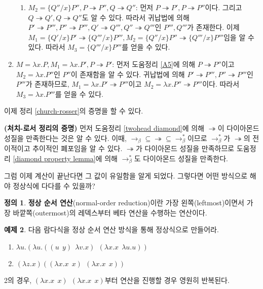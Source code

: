 \documentclass[b5paper, 11pt]{book}
\theoremstyle{definition}
\newtheorem{defn}{정의}[chapter]
\newtheorem{ex}[defn]{예제}
\newenvironment{pf*}{\pushQED{\qed}\pf}
{\popQED\endpf}
\begin{document}
\begin{pf*}
\begin{enumerate}
\begin{enumerate}
            \item $M_2 = \{Q'' / x\} P'', P\twoheadrightarrow P'', Q \twoheadrightarrow Q''$: 먼저 $P\twoheadrightarrow P', P \twoheadrightarrow P''$이다. 그리고 $Q \twoheadrightarrow Q', Q \twoheadrightarrow Q''$도 알 수 있다. 따라서 귀납법에 의해 $P' \twoheadrightarrow P''', P'' \twoheadrightarrow P''', Q' \twoheadrightarrow Q''', Q'' \twoheadrightarrow Q'''$인 $P''', Q'''$가 존재한다. 이제 $M_1 = \{Q' / x\} P' \twoheadrightarrow \{Q''' / x\} P''', M_2  = \{Q'' / x\} P'' \twoheadrightarrow \{Q''' / x\} P'''$임을 알 수 있다. 따라서 $M_3 = \{Q''' / x\} P'''$를 얻을 수 있다.
        \end{enumerate}
        \item $M = \lambda x. P, M_1 = \lambda x .P', P \twoheadrightarrow P'$: 먼저 도움정리 \ref{A5}에 의해 $ P \twoheadrightarrow P'' $이고 $M_2 = \lambda x . P''$인 $P''$이 존재함을 알 수 있다. 귀납법에 의해 $P' \twoheadrightarrow P''', P'' \twoheadrightarrow P'''$인 $P'''$가 존재하므로, $M_1 = \lambda x. P' \twoheadrightarrow P'''$이고 $M_2 = \lambda x. P'' \twoheadrightarrow P'''$이다. 따라서 $M_3 = \lambda x . P'''$를 얻을 수 있다. 
    \end{enumerate}
\end{pf*}
이제 정리 \ref{church-rosser}의 증명을 할 수 있다. 
\begin{pf*} 
    \textbf{(처치-로서 정리의 증명)} 먼저 도움정리 \ref{twohead diamond}에 의해 $\twoheadrightarrow$이 다이아몬드 성질을 만족한다는 것은 알 수 있다. 이때, $\rightarrow_\beta \subseteq \twoheadrightarrow \subseteq \rightarrow_\beta^*$이므로 $\rightarrow_\beta^*$가 $\twoheadrightarrow$의 전이적이고 추이적인 폐포임을 알 수 있다. $\twoheadrightarrow$가 다이아몬드 성질을 만족하므로 도움정리 \ref{diamond property lemma}에 의해 $\rightarrow_\beta^*$도 다이아몬드 성질을 만족한다.
\end{pf*}
그럼 이제 계산이 끝난다면 그 값이 유일함을 알게 되었다. 그렇다면 어떤 방식으로 해야 정상식에 다다를 수 있을까?
\begin{defn}
    \textbf{정상 순서 연산}(normal-order reduction)이란 가장 왼쪽(leftmost)이면서 가장 바깥쪽(outermost)의 레덱스부터 베타 연산을 수행하는 연산이다.
\end{defn}
\begin{ex}
    다음 람다식을 정상 순서 연산 방식을 통해 정상식으로 만들어라.
    \begin{enumerate}
        \item $\lambda u. (\lambda u. ((u \;\, y) \;\, \lambda v. x) \;\, (\lambda x. x \;\, \lambda u. u))$
        \item $(\lambda z. x) ((\lambda x . x \;\, x) \;\, (\lambda x. x \;\, x))$
    \end{enumerate}
    2의 경우, $(\lambda x . x \;\, x) \;\, (\lambda x. x \;\, x)$부터 연산을 진행할 경우 영원히 반복된다.
\end{ex}
\end{document}
